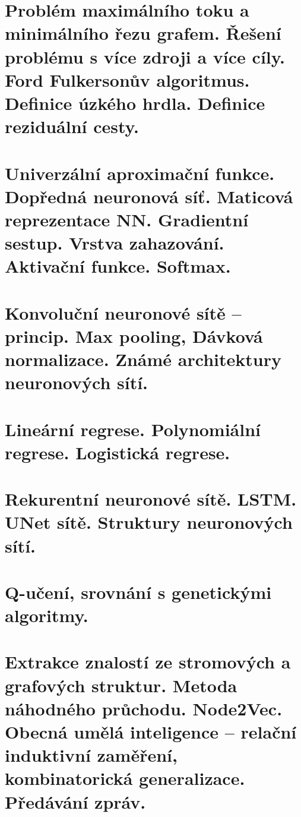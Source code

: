 \clearpage
\section{Problém maximálního toku a minimálního řezu grafem. Řešení problému s více zdroji a více cíly. Ford Fulkersonův algoritmus. Definice úzkého hrdla. Definice reziduální cesty.}


\clearpage
\section{Univerzální aproximační funkce. Dopředná neuronová síť. Maticová reprezentace NN. Gradientní sestup. Vrstva zahazování. Aktivační funkce. Softmax.}


\clearpage
\section{Konvoluční neuronové sítě – princip. Max pooling, Dávková normalizace. Známé architektury neuronových sítí.}


\clearpage
\section{Lineární regrese. Polynomiální regrese. Logistická regrese.}


\clearpage
\section{Rekurentní neuronové sítě. LSTM. UNet sítě. Struktury neuronových sítí.}


\clearpage
\section{Q-učení, srovnání s genetickými algoritmy.}

\clearpage
\section{Extrakce znalostí ze stromových a grafových struktur. Metoda náhodného průchodu. Node2Vec. Obecná umělá inteligence – relační induktivní zaměření, kombinatorická generalizace. Předávání zpráv.}
